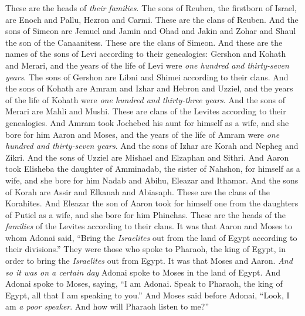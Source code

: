 \begin{biblechapter}
 These are the heads of \textit{their families}. The sons of Reuben, the firstborn of Israel, are Enoch and Pallu, Hezron and Carmi. These are the clans of Reuben.
\verse And the sons of Simeon are Jemuel and Jamin and Ohad and Jakin and Zohar and Shaul the son of the Canaanitess. These are the clans of Simeon.
\verse And these are the names of the sons of Levi according to their genealogies: Gershon and Kohath and Merari, and the years of the life of Levi were \textit{one hundred and thirty-seven years}.
\verse The sons of Gershon are Libni and Shimei according to their clans.
\verse And the sons of Kohath are Amram and Izhar and Hebron and Uzziel, and the years of the life of Kohath were \textit{one hundred and thirty-three years}.
\verse And the sons of Merari are Mahli and Mushi. These are clans of the Levites according to their genealogies.
\verse And Amram took Jochebed his aunt for himself as a wife, and she bore for him Aaron and Moses, and the years of the life of Amram were \textit{one hundred and thirty-seven years}.
\verse And the sons of Izhar are Korah and Nepheg and Zikri.
\verse And the sons of Uzziel are Mishael and Elzaphan and Sithri.
\verse And Aaron took Elisheba the daughter of Amminadab, the sister of Nahshon, for himself as a wife, and she bore for him Nadab and Abihu, Eleazar and Ithamar.
\verse And the sons of Korah are Assir and Elkanah and Abiasaph. These are the clans of the Korahites.
\verse And Eleazar the son of Aaron took for himself one from the daughters of Putiel as a wife, and she bore for him Phinehas. These are the heads of the \textit{families} of the Levites according to their clans.
\verse It was that Aaron and Moses to whom Adonai said, “Bring the \textit{Israelites} out from the land of Egypt according to their divisions.”
\verse They were those who spoke to Pharaoh, the king of Egypt, in order to bring the \textit{Israelites} out from Egypt. It was that Moses and Aaron.
\verse \textit{And so it was on a certain day} Adonai spoke to Moses in the land of Egypt.
\verse And Adonai spoke to Moses, saying, “I am Adonai. Speak to Pharaoh, the king of Egypt, all that I am speaking to you.”
\verse And Moses said before Adonai, “Look, I am \textit{a poor speaker}. And how will Pharaoh listen to me?”
\end{biblechapter}

